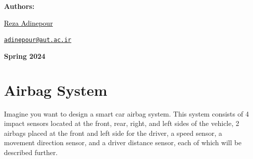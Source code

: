 \documentclass[12pt	]{article}
\begin{document}
\begin{flushleft}
    \textbf{\selectfont Authors:}
\end{flushleft}

\begin{center}
    \begin{minipage}{0.5\textwidth}
        \begin{flushleft}
            \href{https://rezaadinepour.github.io/}{\textcolor{black}{Reza Adinepour}}\\
        \end{flushleft}
    \end{minipage}%
    \begin{minipage}{0.5\textwidth}
        \begin{flushright}
            \href{mailto:adinepour@aut.ac.ir}{\texttt{adinepour@aut.ac.ir}}
        \end{flushright}
    \end{minipage}
\end{center}

\vspace{1em}

    
\begin{center}
    \bigskip \bigskip \bigskip \bigskip
    \large \bf {}\selectfont Spring 2024
\end{center}

\thispagestyle{empty}

\setcounter{page}{0}

\newpage

\tableofcontents

\newpage


\section{Airbag System}
Imagine you want to design a smart car airbag system. This system consists of 4 impact sensors located at the front, rear, right, and left sides of the vehicle, 2 airbags placed at the front and left side for the driver, a speed sensor, a movement direction sensor, and a driver distance sensor, each of which will be described further.
\end{document}
